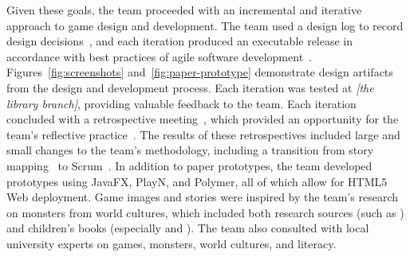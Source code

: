 \documentclass[a4paper]{article}
\begin{document}
Given these goals, the team proceeded with an incremental and
iterative approach to game design and development.
The team used a design log to record design decisions~\citep{Cook2011},
and each iteration
produced an executable release in accordance with best practices of
agile software development~\citep[see, for example,][]{Cockburn2006,Keith2010}. 
Figures~\ref{fig:screenshots} and~\ref{fig:paper-prototype} demonstrate
design artifacts from the design and development process.
Each iteration was tested at
\textit{[the library branch]}, providing valuable feedback to the
team.  Each iteration concluded with a retrospective
meeting~\citep{Kerth2001}, which provided an opportunity for the
team's reflective practice~\citep{Schon1984}.
The results of these retrospectives included large and small changes
to the team's methodology, including a transition from
story mapping~\citep{Patton2014} to Scrum~\citep{Schwaber2013}.
In addition to paper prototypes, the team 
developed prototypes using JavaFX, PlayN, and Polymer, 
all of which allow for HTML5 Web deployment.
Game images and stories were inspired by the team's research on monsters
from world cultures, which included both research sources
(such as \citet{Cohen1996}) and children's books (especially
\citet{Steer2008} and \citet{Stowell2013}).
The team also consulted with local university experts on
games, monsters, world cultures, and literacy.
\end{document}
